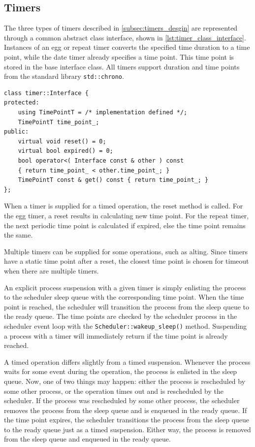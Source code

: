 \subsection{Timers}


The three types of timers described in \cref{subsec:timers_desgin} are represented through a common abstract class interface, shown in \cref{lst:timer_class_interface}. Instances of an egg or repeat timer converts the specified time duration to a time point, while the date timer already specifies a time point. This time point is stored in the base interface class. All timers support duration and time points from the standard library \lstinline[style={CustomC++}]|std::chrono|.

\begin{lstfloat}
\begin{lstlisting}[caption={Timer class interface.}, label={lst:timer_class_interface}, style={CustomC++}, xleftmargin={2em}]
class timer::Interface {
protected:
    using TimePointT = /* implementation defined */;
    TimePointT time_point_;
public:
    virtual void reset() = 0;
    virtual bool expired() = 0;
    bool operator<( Interface const & other ) const 
    { return time_point_ < other.time_point_; }
    TimePointT const & get() const { return time_point_; }
};
\end{lstlisting}
\end{lstfloat}

When a timer is supplied for a timed operation, the reset method is called. For the egg timer, a reset results in calculating new time point. For the repeat timer, the next periodic time point is calculated if expired, else the time point remains the same.

Multiple timers can be supplied for some operations, such as alting. Since timers have a static time point after a reset, the closest time point is chosen for timeout when there are multiple timers.

An explicit process suspension with a given timer is simply enlisting the process to the scheduler sleep queue with the corresponding time point. When the time point is reached, the scheduler will transition the process from the sleep queue to the ready queue. The time points are checked by the scheduler process in the scheduler event loop with the \texttt{Scheduler::wakeup\_sleep()} method. Suspending a process with a timer will immediately return if the time point is already reached.

A timed operation differs slightly from a timed suspension. Whenever the process waits for some event during the operation, the process is enlisted in the sleep queue. Now, one of two things may happen: either the process is rescheduled by some other process, or the operation times out and is rescheduled by the scheduler. If the process was rescheduled by some other process, the scheduler removes the process from the sleep queue and is enqueued in the ready queue. If the time point expires, the scheduler transitions the process from the sleep queue to the ready queue just as a timed suspension. Either way, the process is removed from the sleep queue and enqueued in the ready queue.


